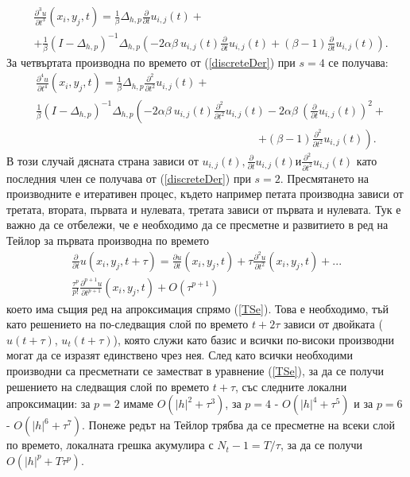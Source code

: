 \documentclass{article}
\newcommand{\rf}[1]{(\ref{#1})}
\begin{document}
\begin{align} \label{der3}
 &\frac{\partial^3 u}{\partial t^3}(x_i, y_j, t) = \frac{1}{\beta}\Delta_{h,p} \frac{\partial}{\partial t}u_{i, j}(t) + \nonumber\\
&+ \frac{1}{\beta} (I-\Delta_{h,p})^{-1}\Delta_{h,p} \left( -2 \alpha \beta \: u_{i, j}(t) \frac{\partial}{\partial t}u_{i, j}(t) +  (\beta-1) \frac{\partial}{\partial t} u_{i, j}(t) \right).
\end{align}
За четвъртата производна по времето от \rf{discreteDer} при $s=4$ се получава:
\begin{align} \label{der4}
&\frac{\partial^4 u}{\partial t^4}(x_i, y_j, t) = \frac{1}{\beta}\Delta_{h,p} \frac{\partial^2}{\partial t^2}u_{i, j}(t) +   \nonumber\\
& \frac{1}{\beta}(I-\Delta_{h,p})^{-1}\Delta_{h,p} \left( -2 \alpha \beta \:  u_{i, j}(t)\frac{\partial^2}{\partial t^2}u_{i, j}(t) -2 \alpha \beta \: \left( \frac{\partial}{\partial t}u_{i, j}(t) \right)^2 + \right. \nonumber\\
&\quad \quad \quad \quad \quad \quad \quad \quad \quad \quad \quad \quad \quad \quad \quad \quad \quad \quad \quad \quad \left. +  (\beta-1) \frac{\partial^2}{\partial t^2} u_{i, j}(t) \right) .
\end{align}
В този случай дясната страна зависи от $u_{i, j}(t), \frac{\partial}{\partial t}u_{i, j}(t) и \frac{\partial^2}{\partial t^2}u_{i, j}(t)$ като последния член се получава от \rf{discreteDer} при $s=2$. Пресмятането на производните е итеративен процес, където например петата производна зависи от третата, втората, първата и нулевата, третата зависи от първата и нулевата. Тук е важно да се отбележи, че е необходимо да се пресметне и развитието в ред на Тейлор за първата производна по времето
\begin{align} \label{TSeDer}
\frac{ \partial}{ \partial t }u(x_i, y_j, t+\tau) = \frac{ \partial u }{ \partial t }(x_i, y_j, t) + \tau \frac{ \partial^2 u }{ \partial t^2 }(x_i, y_j, t)  + ... 
\nonumber\\
\frac{ \tau^p }{ p! } \frac{ \partial^{p+1} u }{ \partial t^{p+1} }(x_i, y_j, t) + O(\tau^{p+1})
\end{align}
което има същия ред на апроксимация спрямо \rf{TSe}. Това е необходимо, тъй като решението на по-следващия слой по времето $t+2\tau$ зависи от двойката ($u(t+\tau)$, $u_t(t+\tau)$), която служи като базис и всички по-високи производни могат да се изразят единствено чрез нея. След като всички необходими производни са пресметнати се заместват в уравнение \rf{TSe}, за да се получи решението на следващия слой по времето $t+\tau$, със следните локални апроксимации: за $p=2$ имаме $O(|h|^2 + \tau^3)$, за $p=4$ - $O(|h|^4 + \tau^5)$ и за $p=6$ - $O(|h|^6 + \tau^7)$. Понеже редът на Тейлор трябва да се пресметне на всеки слой по времето, локалната грешка акумулира с $N_t - 1 = T/\tau$, за да се получи $O(|h|^p + T \tau^p)$.
\end{document}
